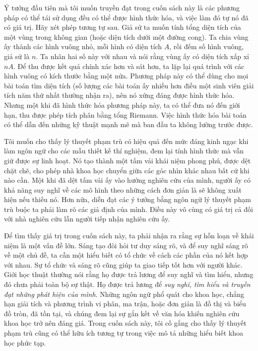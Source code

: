 Ý tưởng đầu tiên mà tôi muốn truyền đạt trong cuốn sách này là các phương pháp có thể tái sử dụng đều có thể được hình thức hóa, và việc làm đó tự nó đã có giá trị. Hãy xét phép tương tự sau. Giả sử ta muốn tính tổng diện tích của một vùng trong không gian (hoặc diện tích dưới một đường cong). Ta chia vùng ấy thành các hình vuông nhỏ, mỗi hình có diện tích $A$, rồi đếm số hình vuông, giả sử là $n$. Ta nhân hai số này với nhau và nói rằng vùng ấy có diện tích xấp xỉ $nA$. Để thu được kết quả chính xác hơn và sát hơn, ta lặp lại quá trình với các hình vuông có kích thước bằng một nửa. Phương pháp này có thể dùng cho mọi bài toán tìm diện tích (số lượng các bài toán ấy nhiều hơn điều một sinh viên giải tích năm thứ nhất thường nhận ra), nên nó xứng đáng được hình thức hóa. Nhưng một khi đã hình thức hóa phương pháp này, ta có thể đưa nó đến giới hạn, thu được phép tích phân bằng tổng Riemann. Việc hình thức hóa bài toán có thể dẫn
đến những kỹ thuật mạnh mẽ mà ban đầu ta không lường trước được.

Tôi muốn cho thấy lý thuyết phạm trù có hiệu quả đến mức đáng kinh ngạc khi làm ngôn ngữ cho các mẫu thiết kế thí nghiệm, đem lại tính hình thức mà vẫn giữ được sự linh hoạt. Nó tạo thành một tấm vải khái niệm phong phú, được dệt chặt chẽ, cho phép nhà khoa học chuyển giữa các góc nhìn khác nhau bất cứ khi nào cần. Một khi đã dệt tấm vải ấy vào hướng nghiên cứu của mình, người ấy có khả năng suy nghĩ về các mô hình theo những cách đơn giản là sẽ không xuất hiện nếu thiếu nó. Hơn nữa, diễn đạt các ý tưởng bằng ngôn ngữ lý thuyết phạm trù buộc ta phải làm rõ các giả định của mình. Điều này vô cùng có giá trị cả đối với nhà nghiên cứu lẫn người tiếp nhận nghiên cứu ấy.

Để tìm thấy giá trị trong cuốn sách này, ta phải nhận ra rằng sự hỗn loạn về khái niệm là một vấn đề lớn. Sáng tạo đòi hỏi tư duy sáng rõ, và để suy nghĩ sáng rõ về một chủ đề, ta cần một hiểu biết có tổ chức về cách các phần của nó kết hợp với nhau. Sự tổ chức và sáng rõ cũng giúp ta giao tiếp tốt hơn với người khác. Giới học thuật thường nói rằng họ được trả lương để suy nghĩ và tìm hiểu, nhưng đó chưa phải toàn bộ sự thật. Họ được trả lương để \emph{suy nghĩ, tìm hiểu và truyền đạt những phát hiện của mình}. Những ngôn ngữ phổ quát cho khoa học, chẳng hạn giải tích và phương trình vi phân, ma trận, hoặc đơn giản là đồ thị và biểu đồ tròn, đã tồn tại, và chúng đem lại sự gắn kết về văn hóa khiến nghiên cứu khoa học trở nên đáng giá. Trong cuốn sách này, tôi cố gắng cho thấy lý thuyết phạm trù cũng có thể hữu ích tương tự trong việc mô tả những hiểu biết khoa học phức tạp.

